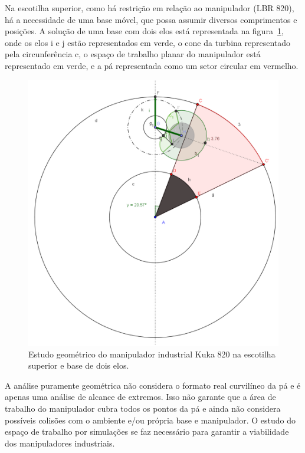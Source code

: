 Na escotilha superior, como há restrição em relação ao manipulador (LBR 820), há
a necessidade de uma base móvel, que possa assumir diversos comprimentos e
posições. A solução de uma base com dois elos está representada na
figura~\ref{pakuka}, onde os elos i e j estão representados em verde, o cone
da turbina representado pela circunferência c, o espaço de trabalho planar do
manipulador está representado em verde, e a pá representada como um setor
circular em vermelho.

\begin{figure}[h!]
\centering
	\includegraphics[width=\columnwidth]{figs/estudo/geometrico/kuka.png} 
	\caption{Estudo geométrico do manipulador industrial Kuka 820 na escotilha
	superior e base de dois elos.}
	\label{pakuka}
\end{figure}

A análise puramente geométrica não considera o formato real curvilíneo da pá e
é apenas uma análise de alcance de extremos. Isso não garante que a área de
trabalho do manipulador cubra todos os pontos da pá e ainda não considera
possíveis colisões com o ambiente e/ou própria base e manipulador. O estudo do
espaço de trabalho por simulações se faz necessário para garantir a viabilidade
dos manipuladores industriais.
